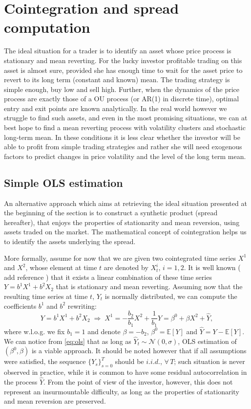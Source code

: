 \documentclass[a4paper,11pt]{article}
\theoremstyle{remark}
\theoremstyle{plain}
\newcommand\ab[1]{{\color{blue} #1 }}
\begin{document}
\section{Cointegration and spread computation}
\label{sec:cointegration}
The ideal situation for a trader is to identify an asset whose price process is stationary and mean reverting. For the lucky investor profitable trading on this asset is almost sure, provided she has enough time to wait for the asset price to revert to its long term (constant and known) mean. The trading strategy is simple enough, buy low and sell high. Further, when the dynamics of the price process are exactly those of a OU process (or AR(1) in discrete time), optimal entry and exit points are known analytically.
In the real world however we struggle to find such assets, and even in the most promising situations, we can at best hope to find a mean reverting process with volatility clusters and stochastic long-term mean. In these conditions it is less clear whether the investor will be able to profit from simple trading strategies and rather she will need exogenous factors to predict changes in price volatility and the level of the long term mean.

\subsection{Simple OLS estimation}
\label{sub:simple_OLS}

An alternative approach which aims at retrieving the ideal situation presented at the beginning of the section is to construct a synthetic product (spread hereafter), that enjoys the properties of stationarity and mean reversion, using assets traded on the market. The mathematical concept of cointegration helps us to identify the assets underlying the spread.

More formally, assume for now that we are given two cointegrated time series $X^1$ and $X^2$, whose element at time $t$ are denoted by $X^i_t$, $i=1,2$. It is well known (\ab{add reference}) that it exists a linear combination of these time series $Y=b^1X^1+b^2X_2$ that is stationary and mean reverting. Assuming now that the resulting time series at time $t$, $Y_t$ is normally distributed, we can compute the coefficients $b^1$ and $b^2$ rewriting:
\begin{equation}
\label{eq:ols}
Y=b^1X^1+b^2X_2\;\Rightarrow\;X^1=-\frac{b_2}{b_1}X^2+\frac{1}{b_1}Y=\beta^0+\beta X^2+\hat{Y},
\end{equation}
where w.l.o.g. we fix $b_1=1$ and denote $\beta=-b_2$, $\beta^0=\mathbb{E}[Y]$ and $\hat{Y}=Y-\mathbb{E}[Y]$. We can notice from \eqref{eq:ols} that as long as $\hat{Y}_t\sim\mathcal{N}(0,\sigma)$, OLS estimation of $(\beta^0,\beta)$ is a viable approach. 
It should be noted however that if all assumptions were satisfied, the sequence $\{Y_s\}_{s=0}^T$ should be $i.i.d.$, $\forall\,T$; such situation is never observed in practice, while it is common to have some residual autocorrelation in the process $\hat{Y}$. From the point of view of the investor, however, this does not represent an insurmountable difficulty, as long as the properties of stationarity and mean reversion are preserved.
\end{document}
